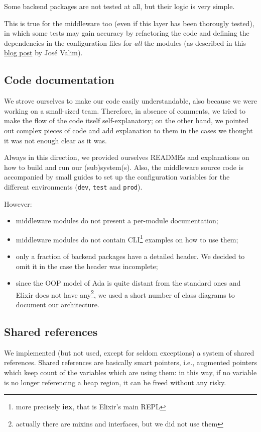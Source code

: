 Some backend packages are not tested at all, but their logic is very simple.

This is true for the middleware too (even if this layer has been thorougly
tested), in which some tests may gain accuracy by refactoring the code and
defining the dependencies in the configuration files for \textit{all} the
modules (as described in this
\href{http://blog.plataformatec.com.br/2015/10/mocks-and-explicit-contracts/}{blog post} by Jos\'e Valim).

\subsection{Code documentation}
We strove ourselves to make our code easily understandable, also because we
were working on a small-sized team.
Therefore, in absence of comments, we tried to make the flow of the code itself
self-explanatory; on the other hand, we pointed out complex pieces of code and
add explanation to them in the cases we thought it was not enough clear as it
was.

Always in this direction, we provided ourselves READMEs and explanations on how
to build and run our (sub)system(s). Also, the middleware source code is
accompanied by small guides to set up the configuration variables for the
different environments (\texttt{dev}, \texttt{test} and \texttt{prod}).

However:
\begin{itemize}
  \item middleware modules do not present a per-module documentation;
  \item middleware modules do not contain CLI\footnote{more precisely
    \textbf{iex}, that is Elixir's main REPL} examples on how to use them;
  \item only a fraction of backend packages have a detailed header. We decided
    to omit it in the case the header was incomplete;
  \item since the OOP model of Ada is quite distant from the standard ones and
    Elixir does not have any\footnote{actually there are mixins and
    interfaces, but we did not use them}, we used a short number of class
    diagrams to document our architecture.
\end{itemize}

\subsection{Shared references}
We implemented (but not used, except for seldom exceptions) a system of shared
references.
Shared references are basically smart pointers, i.e., augmented pointers which
keep count of the variables which are using them: in this way, if no variable
is no longer referencing a heap region, it can be freed without any risky.

